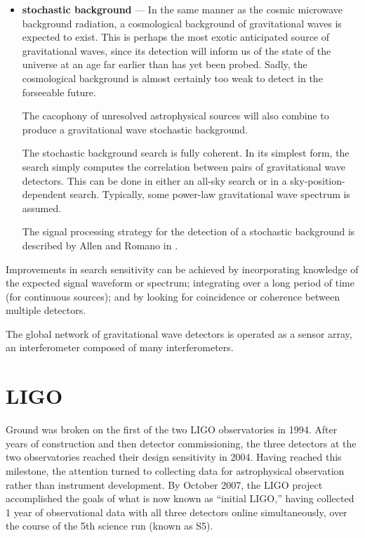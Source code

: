 \begin{itemize}
\item \textbf{stochastic background} --- In the same manner as the
  cosmic microwave background radiation, a cosmological background of
  gravitational waves is expected to exist.  This is perhaps the most
  exotic anticipated source of gravitational waves, since its
  detection will inform us of the state of the universe at an age far
  earlier than has yet been probed.  Sadly, the cosmological
  background is almost certainly too weak to detect in the forseeable
  future.

  The cacophony of unresolved astrophysical sources will also combine
  to produce a gravitational wave stochastic background.   

  The stochastic background search is fully coherent.  In its simplest
  form, the search simply computes the correlation between pairs of
  gravitational wave detectors.  This can be done in either an all-sky
  search or in a sky-position-dependent search.  Typically, some
  power-law gravitational wave spectrum is assumed.
  
  The signal processing strategy for the detection of a stochastic background
  is described by Allen and Romano in \cite{Allen1999Detecting}.
\end{itemize}

Improvements in search sensitivity can be achieved by incorporating
knowledge of the expected signal waveform or spectrum; integrating
over a long period of time (for continuous sources); and by looking
for coincidence or coherence between multiple detectors.

The global network of gravitational wave detectors is operated as a
sensor array, an interferometer composed of many interferometers.

\section{LIGO}

Ground was broken on the first of the two LIGO observatories in 1994.
After years of construction and then detector commissioning, the three
detectors at the two observatories reached their design sensitivity in
2004.  Having reached this milestone, the attention turned to
collecting data for astrophysical observation rather than instrument
development.  By October 2007, the LIGO project accomplished the goals
of what is now known as ``initial LIGO,'' having collected 1 year of
observational data with all three detectors online simultaneously, over
the course of the 5th science run (known as S5).


